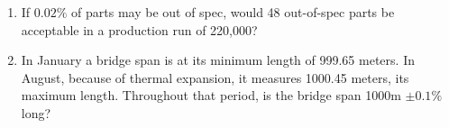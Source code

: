 \documentclass[12pt]{article}
\begin{document}
\begin{enumerate}
\item If $0.02\%$ of parts may be out of spec, would 48 out-of-spec parts be acceptable in a production run of 220,000? 
  \vspace{0.50in}

%
  \item In January a bridge span is at its minimum length of 999.65 meters. In August, because of thermal expansion, it measures 1000.45 meters, its maximum length. Throughout that period, is the bridge span 1000m $\pm0.1\%$ long?
  \vspace{0.50in}

%
%
\end{enumerate}
\end{document}
